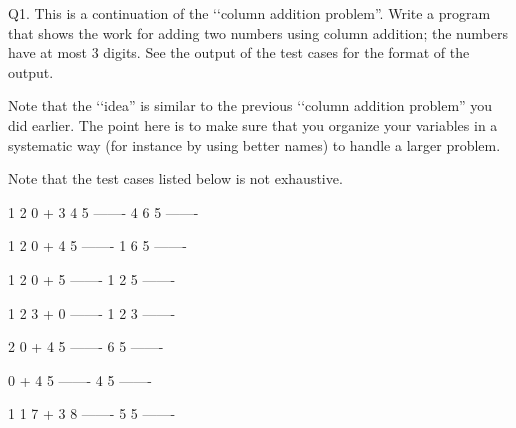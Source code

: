 Q1. This is a continuation of the 
\lq\lq column addition problem''. 
Write a program that shows the work 
for adding two numbers using column addition; the numbers have at most 3 
digits.
See the output of the test cases for the format of the output. 

Note that the \lq\lq idea'' 
is similar to the previous \lq\lq column addition problem'' 
you did earlier. 
The point here is to make sure that you organize your variables in a 
systematic way (for instance by using better names) to handle a 
larger problem. 

Note that the test cases listed below is not exhaustive.

\resett
\nextt
\begin{console}[commandchars=\\\{\}]
  1 2 0
+ 3 4 5
-------
  4 6 5    
-------
\end{console}

\nextt
\begin{console}[commandchars=\\\{\}]
  1 2 0
+   4 5
-------
  1 6 5    
-------
\end{console}

\nextt
\begin{console}[commandchars=\\\{\}]
  1 2 0
+     5
-------
  1 2 5    
-------
\end{console}

\nextt
\begin{console}[commandchars=\\\{\}]
  1 2 3
+     0
-------
  1 2 3    
-------
\end{console}

\nextt
\begin{console}[commandchars=\\\{\}]
    2 0
+   4 5
-------
    6 5    
-------
\end{console}

\nextt
\begin{console}[commandchars=\\\{\}]
      0
+   4 5
-------
    4 5    
-------
\end{console}

\nextt
\begin{console}[commandchars=\\\{\}]
    1
    1 7
+   3 8
-------
    5 5     
-------
\end{console}

